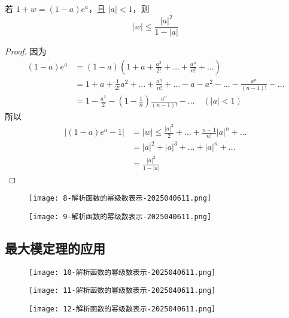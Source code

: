 \begin{exercise}
若 $1+w=(1-a)e^{ a }$，且 $\lvert a \rvert<1$，则
\[
\lvert w \rvert \leq \frac{\lvert a \rvert ^2}{1-\lvert a \rvert }
\]
\end{exercise}
\begin{proof}
因为
\[
\begin{aligned}
(1-a)e^{ a }&= (1-a)\left( 1+a+\frac{a^2}{2!}+\dots+\frac{a^{n}}{n!}+\dots \right) \\
 & =1+a+\frac{1}{2!}a^2+\dots+\frac{a^{n}}{n!}+\dots-a-a^2-\dots-\frac{a^{n}}{(n-1)!}-\dots \\
 & =1-\frac{a^2}{2}-\left( 1-\frac{1}{n} \right)\frac{a^{n}}{(n-1)!}-\dots \quad (\lvert a \rvert <1) 
\end{aligned}
\]
所以
\[
\begin{aligned}
\lvert (1-a)e^{a}-1 \rvert  & =\lvert w \rvert \leq \frac{\lvert a \rvert ^{2}}{2}+\dots+\frac{n-1}{n!}\lvert a \rvert ^{n}+\dots \\
 & =\lvert a \rvert ^2+\lvert a \rvert ^{3}+\dots+\lvert a \rvert ^{n}+\dots \\
 & =\frac{\lvert a \rvert ^2}{1-\lvert a \rvert }
\end{aligned}
\]
\end{proof}
\begin{figure}[H]
\centering
\texttt{[image: 8-解析函数的幂级数表示-2025040611.png]}
\label{}
\end{figure}

\begin{figure}[H]
\centering
\texttt{[image: 9-解析函数的幂级数表示-2025040611.png]}
\label{}
\end{figure}

\subsection{最大模定理的应用}

\begin{figure}[H]
\centering
\texttt{[image: 10-解析函数的幂级数表示-2025040611.png]}
\label{}
\end{figure}

\begin{figure}[H]
\centering
\texttt{[image: 11-解析函数的幂级数表示-2025040611.png]}
\label{}
\end{figure}
\begin{figure}[H]
\centering
\texttt{[image: 12-解析函数的幂级数表示-2025040611.png]}
\label{}
\end{figure}

